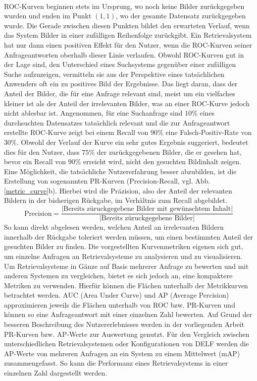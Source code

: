 \\
ROC-Kurven beginnen stets im Ursprung, wo noch keine Bilder zurückgegeben wurden und enden im Punkt $(1,1)$, wo der gesamte Datensatz zurückgegeben wurde. Die Gerade zwischen diesen Punkten bildet den erwarteten Verlauf, wenn das System Bilder in einer zufälligen Reihenfolge zurückgibt. Ein Retrievalsystem hat nur dann einen positiven Effekt für den Nutzer, wenn die ROC-Kurven seiner Anfrageantworten oberhalb dieser Linie verlaufen. Obwohl ROC-Kurven gut in der Lage sind, den Unterschied eines Suchsystems gegenüber einer zufälligen Suche aufzuzeigen, vermitteln sie aus der Perspektive eines tatsächlichen Anwenders oft ein zu positives Bild der Ergebnisse. Das liegt daran, dass der Anteil der Bilder, die für eine Anfrage relevant sind, meist um ein vielfaches kleiner ist als der Anteil der irrelevanten Bilder, was an einer ROC-Kurve jedoch nicht ablesbar ist. Angenommen, für eine Suchanfrage sind $10\%$ eines durchsuchten Datensatzes tatsächlich relevant und die zur Anfrageantwort erstellte ROC-Kurve zeigt bei einem Recall von $90\%$ eine Falsch-Positiv-Rate von $30\%$. Obwohl der Verlauf der Kurve ein sehr gutes Ergebnis suggeriert, bedeutet dies für den Nutzer, dass $75\%$ der zurückgegebenen Bilder, die er gesehen hat, bevor ein Recall von $90\%$ erreicht wird, nicht den gesuchten Bildinhalt zeigen. Eine Möglichkeit, die tatsächliche Nutzererfahrung besser abzubilden, ist die Erstellung von sogenannten PR-Kurven (Precision-Recall, vgl. Abb. \ref{metric_curve}b). Hierbei wird die Präzision, also der Anteil der relevanten Bildern in der bisherigen Rückgabe, im Verhältnis zum Recall abgebildet.
\begin{equation}
\text{Precision} = \frac{|\text{Bereits züruckgegebene Bilder mit gewünschtem Inhalt}|}{|\text{Bereits züruckgegebene Bilder}|}
\end{equation}
So kann direkt abgelesen werden, welchen Anteil an irrelevanten Bildern innerhalb der Rückgabe toleriert werden müssen, um einen bestimmten Anteil der gesuchten Bilder zu finden.
Die vorgestellten Kurvenmetriken eigenen sich gut, um einzelne Anfragen an Retrievalsysteme zu analysieren und zu visualisieren. Um Retrievalsysteme in Gänze auf Basis mehrerer Anfrage zu bewerten und mit anderen Systemen zu vergleichen, bietet es sich jedoch an, eine kompaktere Metriken zu verwenden. Hierfür können die Flächen unterhalb der Metrikkurven betrachtet werden. AUC (Area Under Curve) und AP (Average Percision) approximieren jeweils die Flächen unterhalb von ROC bzw. PR-Kurven und können so eine Anfrageantwort mit einer einzelnen Zahl bewerten. Auf Grund der besseren Beschreibung des Nutzererlebnisses werden in der vorliegenden Arbeit PR-Kurven bzw. AP-Werte zur Auswertung genutzt. Für den Vergleich zwischen unterschiedlichen Retrievalsystemen oder Konfigurationen von DELF werden die AP-Werte von mehreren Anfragen an ein System zu einem Mittelwert (mAP) zusammengefasst. So kann die Performanz eines Retrievalsystems in einer einzelnen Zahl dargestellt werden. 
 

